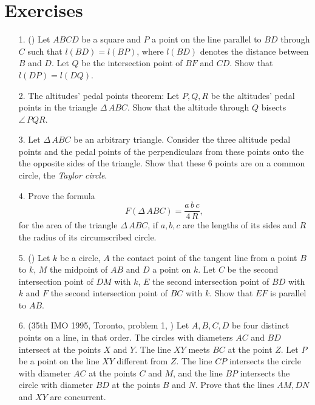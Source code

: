 \documentclass{article}
\begin{document}
\section{Exercises}

\begin{itemize}
\item[1.] (\cite[p. 267]{Chou:84}) Let $ABCD$ be a square and $P$ a
point on the line parallel to $BD$ through $C$ such that
$l(BD)=l(BP)$, where $l(BD)$ denotes the distance between $B$ and
$D$. Let $Q$ be the intersection point of $BF$ and $CD$. Show that
$l(DP)=l(DQ)$.

\item[2.] The altitudes' pedal points theorem: Let $P,Q,R$ be the
altitudes' pedal points in the triangle $\Delta\,ABC$. Show that the
altitude through $Q$ bisects $\angle\, PQR$.

\item[3.] Let $\Delta\,ABC$ be an arbitrary triangle. Consider the
three altitude pedal points and the pedal points of the perpendiculars
from these points onto the the opposite sides of the triangle. Show
that these 6 points are on a common circle, the {\em Taylor circle}.  

\item[4.] Prove the formula \[F(\Delta\,ABC) = \frac{a\,b\,c}{4\,R},\]
for the area of the triangle $\Delta\,ABC$, if $a,b,c$ are the lengths
of its sides and $R$ the radius of its circumscribed circle.

\item[5.] (\cite[p. 283]{Chou:84}) Let $k$ be a circle, $A$ the contact
point of the tangent line from a point $B$ to $k$, $M$ the midpoint of
$AB$ and $D$ a point on $k$. Let $C$ be the second intersection point
of $DM$ with $k$, $E$ the second intersection point of $BD$ with $k$
and $F$ the second intersection point of $BC$ with $k$. Show that $EF$
is parallel to $AB$.

\item[6.] (35th IMO 1995, Toronto, problem 1, \cite{IMO}) Let
$A,B,C,D$ be four distinct points on a line, in that order. The
circles with diameters $AC$ and $BD$ intersect at the points $X$ and
$Y$. The line $XY$ meets $BC$ at the point $Z$. Let $P$ be a point on
the line $XY$ different from $Z$. The line $CP$ intersects the circle
with diameter $AC$ at the points $C$ and $M$, and the line $BP$
intersects the circle with diameter $BD$ at the points $B$ and
$N$. Prove that the lines $AM, DN$ and $XY$ are concurrent.


\end{itemize}
\end{document}
